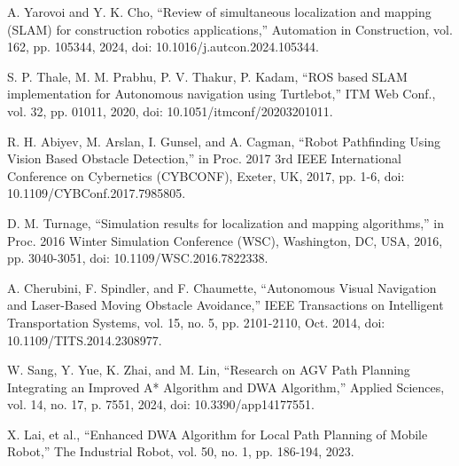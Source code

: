 \documentclass{article}
\begin{document}

\begin{thebibliography}{9}


A. Yarovoi and Y. K. Cho, ``Review of simultaneous localization and mapping (SLAM) for construction robotics applications,'' Automation in Construction, vol. 162, pp. 105344, 2024, doi: 10.1016/j.autcon.2024.105344.

S. P. Thale, M. M. Prabhu, P. V. Thakur, P. Kadam, ``ROS based SLAM implementation for Autonomous navigation using Turtlebot,'' ITM Web Conf., vol. 32, pp. 01011, 2020, doi: 10.1051/itmconf/20203201011.

R. H. Abiyev, M. Arslan, I. Gunsel, and A. Cagman, ``Robot Pathfinding Using Vision Based Obstacle Detection,'' in Proc. 2017 3rd IEEE International Conference on Cybernetics (CYBCONF), Exeter, UK, 2017, pp. 1-6, doi: 10.1109/CYBConf.2017.7985805.

D. M. Turnage, ``Simulation results for localization and mapping algorithms,'' in Proc. 2016 Winter Simulation Conference (WSC), Washington, DC, USA, 2016, pp. 3040-3051, doi: 10.1109/WSC.2016.7822338.

A. Cherubini, F. Spindler, and F. Chaumette, ``Autonomous Visual Navigation and Laser-Based Moving Obstacle Avoidance,'' IEEE Transactions on Intelligent Transportation Systems, vol. 15, no. 5, pp. 2101-2110, Oct. 2014, doi: 10.1109/TITS.2014.2308977.

W. Sang, Y. Yue, K. Zhai, and M. Lin,  ``Research on AGV Path Planning Integrating an Improved A* Algorithm and DWA Algorithm,'' Applied Sciences, vol. 14, no. 17, p. 7551, 2024, doi: 10.3390/app14177551.

X. Lai, et al., ``Enhanced DWA Algorithm for Local Path Planning of Mobile Robot,'' The Industrial Robot, vol. 50, no. 1, pp. 186-194, 2023. 


\end{thebibliography}
\end{document}

